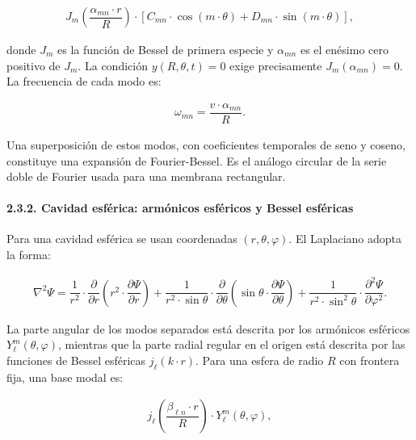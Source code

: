 \documentclass[
  spanish,
]{article}
\begin{document}
\[
\begin{aligned}
J_m\left(\dfrac{\alpha_{mn} \cdot r}{R}\right)
\cdot \left[C_{mn} \cdot \cos(m \cdot \theta) + D_{mn} \cdot \sin(m \cdot \theta)\right],
\end{aligned}
\]

donde \(J_m\) es la función de Bessel de primera especie y
\(\alpha_{mn}\) es el enésimo cero positivo de \(J_m\). La condición
\(y(R,\theta,t)=0\) exige precisamente \(J_m(\alpha_{mn})=0\). La
frecuencia de cada modo es:

\[
\begin{aligned}
\omega_{mn} = \dfrac{v \cdot \alpha_{mn}}{R}.
\end{aligned}
\]

Una superposición de estos modos, con coeficientes temporales de seno y
coseno, constituye una expansión de Fourier-Bessel. Es el análogo
circular de la serie doble de Fourier usada para una membrana
rectangular.

\paragraph{2.3.2. Cavidad esférica: armónicos esféricos y Bessel
esféricas}\label{cavidad-esfuxe9rica-armuxf3nicos-esfuxe9ricos-y-bessel-esfuxe9ricas}

Para una cavidad esférica se usan coordenadas \((r,\theta,\varphi)\). El
Laplaciano adopta la forma:

\[
\begin{aligned}
\nabla^2 \Psi
= \dfrac{1}{r^2} \cdot \dfrac{\partial}{\partial r}
\left(r^2 \cdot \dfrac{\partial \Psi}{\partial r}\right)
+ \dfrac{1}{r^2 \cdot \sin\theta} \cdot \dfrac{\partial}{\partial\theta}
\left(\sin\theta \cdot \dfrac{\partial\Psi}{\partial\theta}\right)
+ \dfrac{1}{r^2 \cdot \sin^2\theta} \cdot \dfrac{\partial^2\Psi}{\partial\varphi^2}.
\end{aligned}
\]

La parte angular de los modos separados está descrita por los armónicos
esféricos \(Y_\ell^m(\theta,\varphi)\), mientras que la parte radial
regular en el origen está descrita por las funciones de Bessel esféricas
\(j_\ell(k \cdot r)\). Para una esfera de radio \(R\) con frontera fija,
una base modal es:

\[
\begin{aligned}
j_\ell\left(\dfrac{\beta_{\ell n} \cdot r}{R}\right)
\cdot Y_\ell^m(\theta,\varphi),
\end{aligned}
\]
\end{document}
